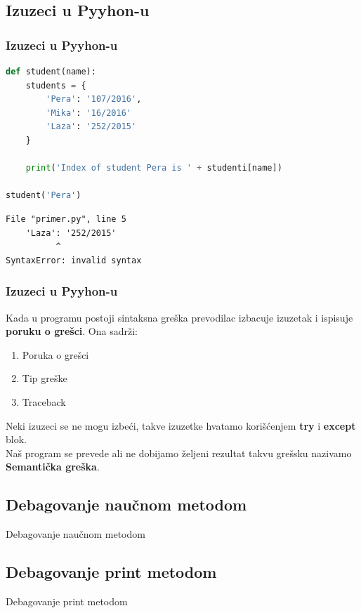 \documentclass{beamer}
\begin{document}
\subsection{Izuzeci u Pyyhon-u}
\begin{frame}[fragile]
\frametitle{Izuzeci u Pyyhon-u}
\begin{exampleblock}{}
\begin{lstlisting}[language = python]
def student(name):
    students = {
        'Pera': '107/2016',
        'Mika': '16/2016'
        'Laza': '252/2015'
    }

    print('Index of student Pera is ' + studenti[name])

student('Pera')
\end{lstlisting}
\end{exampleblock}
\begin{exampleblock}{}
\begin{lstlisting}[language = shell]
  File "primer.py", line 5
    'Laza': '252/2015'
          ^
SyntaxError: invalid syntax
\end{lstlisting}
\end{exampleblock}
\end{frame}
\begin{frame}
\frametitle{Izuzeci u Pyyhon-u}
Kada u programu postoji sintaksna greška prevodilac izbacuje izuzetak i ispisuje \textbf{poruku o grešci}. Ona sadrži:
\begin{enumerate}
    \item Poruka o grešci
    \item Tip greške
    \item Traceback
\end{enumerate}
Neki izuzeci se ne mogu izbeći, takve izuzetke hvatamo korišćenjem \textbf{try} i \textbf{except} blok. \\
Naš program se prevede ali ne dobijamo željeni rezultat takvu grešsku nazivamo \textbf{Semantička greška}. 
\end{frame}
\subsection{Debagovanje naučnom metodom}
\begin{frame}{Debagovanje naučnom metodom}
    
\end{frame}
\subsection{Debagovanje print metodom}
\begin{frame}{Debagovanje print metodom}
    
\end{frame}
\end{document}
